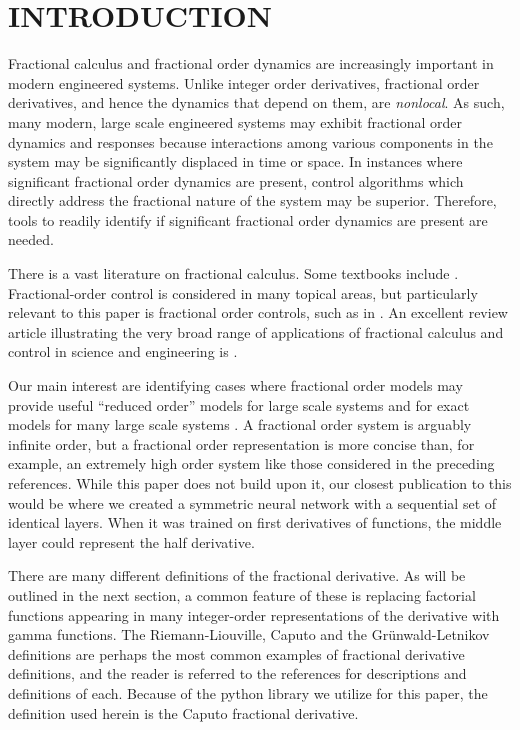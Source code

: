 \section{INTRODUCTION}

  Fractional calculus and fractional order dynamics are increasingly important
  in modern engineered systems. Unlike integer order derivatives, fractional
  order derivatives, and hence the dynamics that depend on them, are
  \emph{nonlocal}. As such, many modern, large scale engineered systems may
  exhibit fractional order dynamics and responses because interactions among
  various components in the system may be significantly displaced in time or
  space. In instances where significant fractional order dynamics are present,
  control algorithms which directly address the fractional nature of the system
  may be superior.  Therefore, tools to readily identify if significant
  fractional order dynamics are present are needed.

  There is a vast literature on fractional calculus. Some textbooks include
  \cite{fracbook,fracbook2,oustaloup}.  Fractional-order control is considered
  in many topical areas, but particularly relevant to this paper is fractional
  order controls, such as in \cite{fraccontrol,YQChenAcc}. An excellent review
  article illustrating the very broad range of applications of fractional
  calculus and control in science and engineering is \cite{SUN2018213}.


  Our main interest are identifying cases where fractional order models may
  provide useful ``reduced order'' models for large scale systems
  \cite{goodwinemed2023,goodwinemmar2023} and for exact models for many large
  scale systems
  \cite{Goodwine2014Modeling,Leyden2016Using,Leyden2019Large,bg:xnids2022,bg:xninonlinear2020}.
  A fractional order system is arguably infinite order, but a fractional order
  representation is more concise than, for example, an extremely high order
  system like those considered in the preceding references.  While this paper
  does not build upon it, our closest publication to this would be
  \cite{bg:chenSII2022} where we created a symmetric neural network with a
  sequential set of identical layers. When it was trained on first derivatives
  of functions, the middle layer could represent the half derivative. 
 
 There are many different definitions of the fractional derivative. As will be
 outlined in the next section, a common feature of these is replacing factorial
 functions appearing in many integer-order representations of the derivative
 with gamma functions. The Riemann-Liouville, Caputo and the Gr\"unwald-Letnikov
 definitions are perhaps the most common examples of fractional derivative
 definitions, and the reader is referred to the references
 \cite{Machado20111140,4609961,series/lnee/Ortigueira11,das2011functional} for
 descriptions and definitions of each. Because of the python library we utilize
 for this paper, the definition used herein is the Caputo fractional derivative. 

